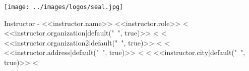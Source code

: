 \documentclass[a4paper,10pt]{article}
\begin{document}
\begin{multicols}{3}
 \begin{minipage}[b][4cm][b]{0.4\textwidth}
   
  
 \end{minipage}%
 \columnbreak
 \begin{minipage}[b][4cm][b]{0.2\textwidth}
 \texttt{[image: ../images/logos/seal.jpg]}
 \end{minipage}%
 \columnbreak
 \begin{flushright}
 \raggedleft
 \begin{minipage}[b][4cm][b]{0.4\textwidth}
     Instructor - <<instructor.name>>\newline
     \footnotesize{<<instructor.role>>}\newline
  \phantom{H}
  <%
     <<instructor.organization|default("~", true)>> \newline
  <%
  <%
    <<instructor.organization2|default("~", true)>> \newline
  <%
  <%
     <<instructor.address|default("~", true)>>\newline
  <%
  <%
     <<instructor.city|default("~", true)>>\newline
  <%
 \end{minipage}
 \end{flushright}

\end{multicols}
\end{document}
